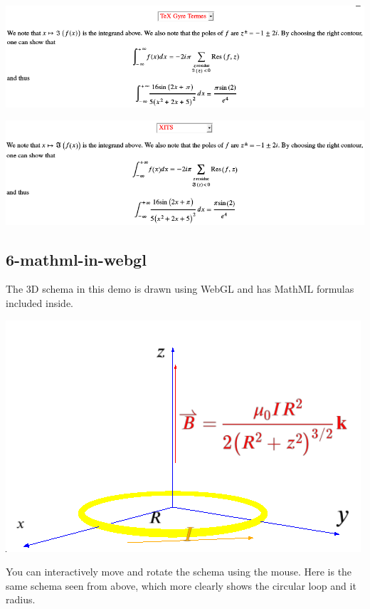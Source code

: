 \includegraphics[width=\textwidth]{screenshots/4-mathml-fonts-tex-gyre-termes}

\includegraphics[width=\textwidth]{screenshots/4-mathml-fonts-xits}

\subsection{6-mathml-in-webgl}

The 3D schema in this demo is drawn using WebGL and has MathML formulas
included inside.

\includegraphics{screenshots/6-mathml-in-webgl-1}

You can interactively move and rotate the schema using the mouse. Here is the
same schema seen from above, which more clearly shows the circular loop and it
radius.

